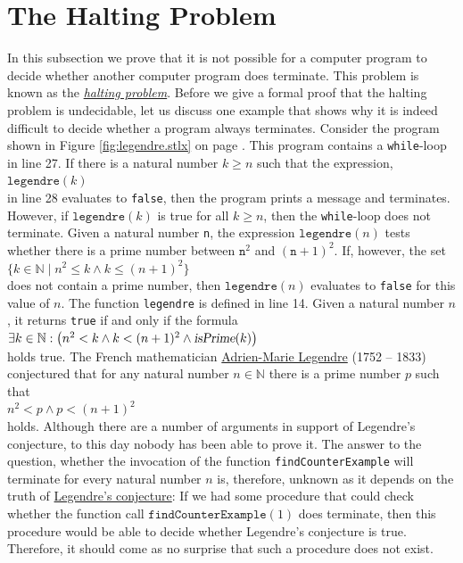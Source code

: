 \section{The Halting Problem}
In this subsection we prove that it is not possible for a computer program to decide whether 
another computer program does terminate.
This problem is known as the 
\href{http://en.wikipedia.org/wiki/Halting_problem}{\emph{halting problem}}.
Before we give a formal proof that the halting problem is undecidable, let us
discuss one example that shows why it is indeed difficult to decide whether a program always
terminates.
Consider the program shown in Figure \ref{fig:legendre.stlx} on page
\pageref{fig:legendre.stlx}.  This program contains a \texttt{while}-loop in line 27.  
If there is a natural number $k \geq n$ such that the expression,
\\[0.2cm]
\hspace*{1.3cm}
$\mathtt{legendre}(k)$
\\[0.2cm]
in line 28 evaluates to \texttt{false}, then the program prints a message and terminates.
However, if 
$\mathtt{legendre}(k)$ is true for all $k \geq n$, then the \texttt{while}-loop does not terminate.
Given a natural number \texttt{n}, the expression
$\texttt{legendre}(n)$ tests whether there is a prime number between $\texttt{n}^2$ and $(\texttt{n}+1)^2$.
If, however, the set
\\[0.2cm]
\hspace*{1.3cm}
$\{ k \in \mathbb{N} \mid n^2 \leq k \wedge k \leq (n+1)^2 \}$
\\[0.2cm]
does not contain a prime number, then $\texttt{legendre}(n)$ evaluates
to \texttt{false} for this value of $n$.
The function \texttt{legendre} is defined in line 14.  
Given a natural number $n$, it returns \texttt{true} if and only if the formula
\\[0.2cm]
\hspace*{1.3cm}
$\exists k \in \mathbb{N}:\bigl( n^2 < k \wedge k < (n+1)^2 \wedge \textsl{isPrime}(k)\bigr)$
\\[0.2cm]
holds true.
The French mathematician 
\href{http://en.wikipedia.org/wiki/Adrien-Marie_Legendre}{Adrien-Marie Legendre} (1752 -- 1833) conjectured that
for any natural number $n \in \mathbb{N}$ there is a prime number $p$ such that
\\[0.2cm]
\hspace*{1.3cm}
$n^2 < p \wedge  p < (n+1)^2$
\\[0.2cm]
holds.
Although there are a number of arguments in support of Legendre's conjecture,  to this day
nobody has been able to prove it.
The answer to the question, whether the invocation of the function \texttt{findCounterExample} will
terminate for every natural number $n$ is, therefore, unknown as it depends on the truth of 
\href{http://en.wikipedia.org/wiki/Legendre's_conjecture}{Legendre's conjecture}:  If we
had some procedure that could check whether the function call $\texttt{findCounterExample}(1)$ does terminate,
then this procedure would be able to decide whether Legendre's conjecture is true.
Therefore, it should come as no surprise that such a procedure does not exist.

